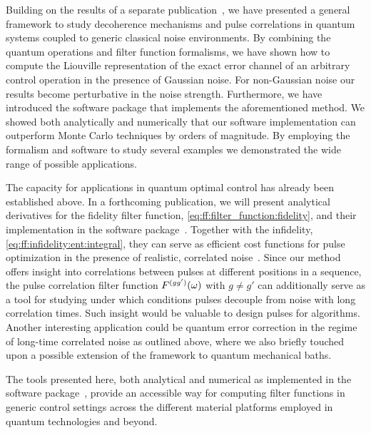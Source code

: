 Building on the results of a separate publication~\cite{Cerfontaine2021}, we have presented a general framework to study decoherence mechanisms and pulse correlations in quantum systems coupled to generic classical noise environments.
By combining the quantum operations and filter function formalisms, we have shown how to compute the Liouville representation of the exact error channel of an arbitrary control operation in the presence of Gaussian noise.
For non-Gaussian noise our results become perturbative in the noise strength.
Furthermore, we have introduced the \filterfunctions \python software package that implements the aforementioned method.
We showed both analytically and numerically that our software implementation can outperform Monte Carlo techniques by orders of magnitude.
By employing the formalism and software to study several examples we demonstrated the wide range of possible applications.

The capacity for applications in quantum optimal control has already been established above.
In a forthcoming publication, we will present analytical derivatives for the fidelity filter function, \cref{eq:ff:filter_function:fidelity}, and their implementation in the software package~\cite{Le2022}.
Together with the infidelity, \cref{eq:ff:infidelity:ent:integral}, they can serve as efficient cost functions for pulse optimization in the presence of realistic, correlated noise~\cite{Teske2022}.
Since our method offers insight into correlations between pulses at different positions in a sequence, the pulse correlation filter function $F^{(gg')}(\omega)$ with $g\neq g'$ can additionally serve as a tool for studying under which conditions pulses decouple from noise with long correlation times.
Such insight would be valuable to design pulses for algorithms.
Another interesting application could be quantum error correction in the regime of long-time correlated noise as outlined above, where we also briefly touched upon a possible extension of the framework to quantum mechanical baths.

The tools presented here, both analytical and numerical as implemented in the \filterfunctions software package~\cite{Hangleiter_ff}, provide an accessible way for computing filter functions in generic control settings across the different material platforms employed in quantum technologies and beyond.

